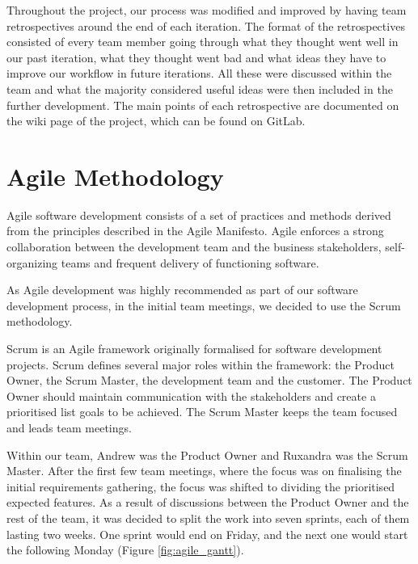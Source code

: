 \documentclass{l3proj}
\begin{document}
Throughout the project, our process was modified and improved by having team
 retrospectives around the end of each iteration. The format of the retrospectives
 consisted of every team member going through what they thought went well in
 our past iteration, what they thought went bad and what ideas they have to
 improve our workflow in future iterations. All these were discussed within
 the team and what the majority considered useful ideas were then included
 in the further development. The main points of each retrospective are
 documented on the wiki page of the project, which can be found on GitLab.

\section{Agile Methodology} %
\label{sec:agile}


Agile software development consists of a set of practices and methods derived
 from the principles described in the Agile Manifesto. Agile enforces a strong
 collaboration between the development team and the business stakeholders,
 self-organizing teams and frequent delivery of functioning
 software\cite{agile_overview}.

As Agile development was highly recommended as part of our software development
 process, in the initial team meetings, we decided to use the Scrum
 methodology.

 Scrum is an Agile framework originally formalised for software development
 projects. Scrum defines several major roles within the framework: the Product
 Owner, the Scrum Master, the development team and the customer. The Product
 Owner should maintain communication with the stakeholders and create a prioritised
 list goals to be achieved. The Scrum Master keeps the team focused and leads team
 meetings\cite{scrum_overview}.

 Within our team, Andrew was the Product Owner and Ruxandra was the Scrum Master.
  After the first few team meetings, where the focus was on finalising the initial
  requirements gathering, the focus was shifted to dividing the prioritised
  expected features. As a result of discussions between the Product Owner and
  the rest of the team, it was decided to split the work into seven sprints,
  each of them lasting two weeks. One sprint would end on Friday, and the next
  one would start the following Monday (Figure \ref{fig:agile_gantt}).
\end{document}
